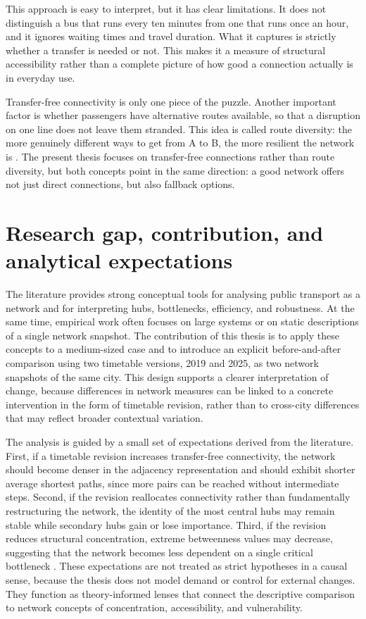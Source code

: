 \documentclass[12pt,a4paper,oneside]{report}
\begin{document}
This approach is easy to interpret, but it has clear limitations.
It does not distinguish a bus that runs every ten minutes from one that runs once an hour, and it ignores waiting times and travel duration.
What it captures is strictly whether a transfer is needed or not.
This makes it a measure of structural accessibility rather than a complete picture of how good a connection actually is in everyday use.

Transfer-free connectivity is only one piece of the puzzle.
Another important factor is whether passengers have alternative routes available, so that a disruption on one line does not leave them stranded.
This idea is called route diversity: the more genuinely different ways to get from A to B, the more resilient the network is \citep{li2024}.
The present thesis focuses on transfer-free connections rather than route diversity, but both concepts point in the same direction: a good network offers not just direct connections, but also fallback options.

\section{Research gap, contribution, and analytical expectations}\label{sec:research-gap}

The literature provides strong conceptual tools for analysing public transport as a network and for interpreting hubs, bottlenecks, efficiency, and robustness.
At the same time, empirical work often focuses on large systems or on static descriptions of a single network snapshot.
The contribution of this thesis is to apply these concepts to a medium-sized case and to introduce an explicit before-and-after comparison using two timetable versions, 2019 and 2025, as two network snapshots of the same city.
This design supports a clearer interpretation of change, because differences in network measures can be linked to a concrete intervention in the form of timetable revision, rather than to cross-city differences that may reflect broader contextual variation.

The analysis is guided by a small set of expectations derived from the literature.
First, if a timetable revision increases transfer-free connectivity, the network should become denser in the adjacency representation and should exhibit shorter average shortest paths, since more pairs can be reached without intermediate steps.
Second, if the revision reallocates connectivity rather than fundamentally restructuring the network, the identity of the most central hubs may remain stable while secondary hubs gain or lose importance.
Third, if the revision reduces structural concentration, extreme betweenness values may decrease, suggesting that the network becomes less dependent on a single critical bottleneck \citep{derrible2010}.
These expectations are not treated as strict hypotheses in a causal sense, because the thesis does not model demand or control for external changes.
They function as theory-informed lenses that connect the descriptive comparison to network concepts of concentration, accessibility, and vulnerability.
\end{document}
